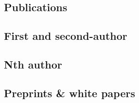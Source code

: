\documentclass[12pt,letterpaper]{article}
\begin{document}
\newpage
\subsection*{Publications}                              

                                                            
                                                                                
\subsection*{First and second-author}                              
                                                                                
\begin{list}{}{\cvlist}                                                         
                                                        
\end{list}                                                                      
                                                                                
\subsection*{Nth author}                                           
                                                                                
\begin{list}{}{\cvlist}                                                         
                                                                
\end{list}                                                                      
                                                                                
\subsection*{Preprints \& white papers}                                         
                                                                                
\begin{list}{}{\cvlist}                                                         
                                                              
\end{list}    
\end{document}
